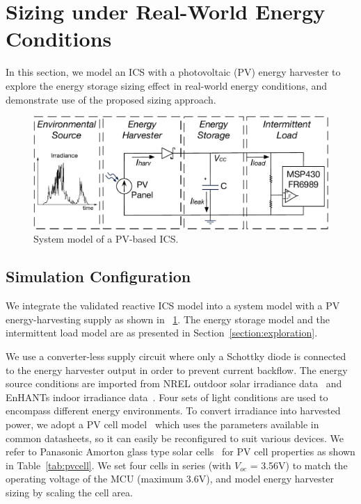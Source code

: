 
\section{Sizing under Real-World Energy Conditions} \label{section:demo}

In this section, we model an ICS with a photovoltaic (PV) energy harvester to explore the energy storage sizing effect in real-world energy conditions, and demonstrate use of the proposed sizing approach. 

\begin{figure}[!t]
    \centering
    \includegraphics[width=0.8\columnwidth]{ch4_sizingapproach/figures/solarmodel4}
    \caption{System model of a PV-based ICS.}
    \label{fig:Model}
\end{figure}

\subsection{Simulation Configuration}

We integrate the validated reactive ICS model into a system model with a PV energy-harvesting supply as shown in \figurename{~\ref{fig:Model}}. 
The energy storage model and the intermittent load model are as presented in Section~\ref{section:exploration}. 

We use a converter-less supply circuit where only a Schottky diode is connected to the energy harvester output in order to prevent current backflow. 
The energy source conditions are imported from NREL outdoor solar irradiance data~\cite{stoffel1981nrel} and EnHANTs indoor irradiance data~\cite{6244798}. Four sets of light conditions are used to encompass different energy environments. 
To convert irradiance into harvested power, we adopt a PV cell model~\cite{en9050326} which uses the parameters available in common datasheets, so it can easily be reconfigured to suit various devices. 
We refer to Panasonic Amorton glass type solar cells~\cite{solarcell} for PV cell properties as shown in Table~\ref{tab:pvcell}. We set four cells in series (with $V_{oc}$ = 3.56V) to match the operating voltage of the MCU (maximum 3.6V), and model energy harvester sizing by scaling the cell area. 

